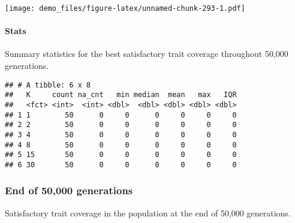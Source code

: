 \documentclass[]{book}
\newenvironment{Shaded}{\begin{snugshade}}{\end{snugshade}}
\newcommand{\DataTypeTok}[1]{\textcolor[rgb]{0.13,0.29,0.53}{#1}}
\newcommand{\KeywordTok}[1]{\textcolor[rgb]{0.13,0.29,0.53}{\textbf{#1}}}
\newcommand{\NormalTok}[1]{#1}
\newcommand{\OperatorTok}[1]{\textcolor[rgb]{0.81,0.36,0.00}{\textbf{#1}}}
\newcommand{\OtherTok}[1]{\textcolor[rgb]{0.56,0.35,0.01}{#1}}
\newcommand{\StringTok}[1]{\textcolor[rgb]{0.31,0.60,0.02}{#1}}
\let\oldparagraph\paragraph
\renewcommand{\paragraph}[1]{\oldparagraph{#1}\mbox{}}
\begin{document}
\texttt{[image: demo\_files/figure-latex/unnamed-chunk-293-1.pdf]}

\hypertarget{stats-55}{%
\paragraph{Stats}\label{stats-55}}

Summary statistics for the best satisfactory trait coverage throughout 50,000 generations.

\begin{Shaded}
\end{Shaded}

\begin{verbatim}
## # A tibble: 6 x 8
##   K     count na_cnt   min median  mean   max   IQR
##   <fct> <int>  <int> <dbl>  <dbl> <dbl> <dbl> <dbl>
## 1 1        50      0     0      0     0     0     0
## 2 2        50      0     0      0     0     0     0
## 3 4        50      0     0      0     0     0     0
## 4 8        50      0     0      0     0     0     0
## 5 15       50      0     0      0     0     0     0
## 6 30       50      0     0      0     0     0     0
\end{verbatim}

\hypertarget{end-of-50000-generations-26}{%
\subsubsection{End of 50,000 generations}\label{end-of-50000-generations-26}}

Satisfactory trait coverage in the population at the end of 50,000 generations.
\end{document}
